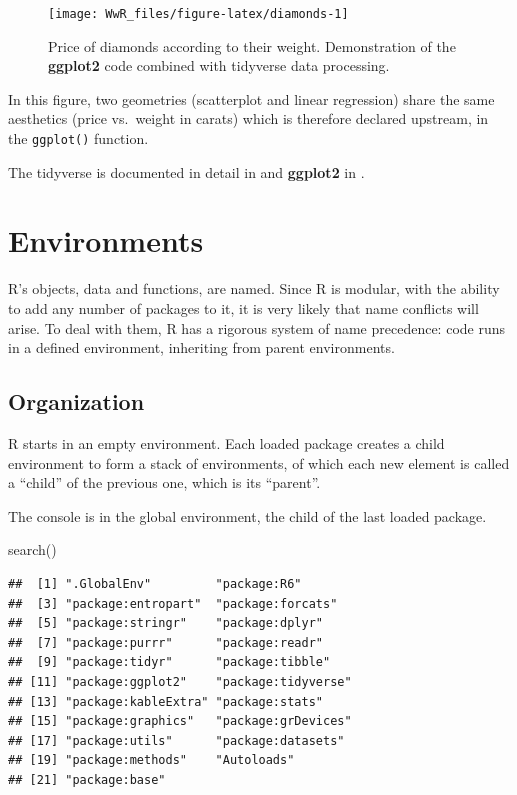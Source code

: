 \documentclass[
  12pt,
  american,
  a4paper,
  extrafontsizes,onecolumn,openright
  ]{memoir}
\newenvironment{Shaded}{\begin{snugshade}}{\end{snugshade}}
\newcommand{\FunctionTok}[1]{\textcolor[rgb]{0.00,0.00,0.00}{#1}}
\newcommand{\NormalTok}[1]{#1}
\begin{document}
\begin{figure}

{\centering \texttt{[image: WwR\_files/figure-latex/diamonds-1]} 

}

\caption{Price of diamonds according to their weight. Demonstration of the \textbf{ggplot2} code combined with tidyverse data processing.}\label{fig:diamonds}
\end{figure}

\normalsize

In this figure, two geometries (scatterplot and linear regression) share the same aesthetics (price vs.~weight in carats) which is therefore declared upstream, in the \texttt{ggplot()} function.

The tidyverse is documented in detail in \textcite{Wickham2016} and \textbf{ggplot2} in \textcite{Wickham2017}.

\hypertarget{sec:environnements}{%
\section{Environments}\label{sec:environnements}}

R's objects, data and functions, are named.
Since R is modular, with the ability to add any number of packages to it, it is very likely that name conflicts will arise.
To deal with them, R has a rigorous system of name precedence: code runs in a defined environment, inheriting from parent environments.

\hypertarget{organization}{%
\subsection{Organization}\label{organization}}

R starts in an empty environment.
Each loaded package creates a child environment to form a stack of environments, of which each new element is called a \enquote{child} of the previous one, which is its \enquote{parent}.

The console is in the global environment, the child of the last loaded package.

\scriptsize

\begin{Shaded}
\begin{Highlighting}[]
\FunctionTok{search}\NormalTok{()}
\end{Highlighting}
\end{Shaded}

\begin{verbatim}
##  [1] ".GlobalEnv"         "package:R6"        
##  [3] "package:entropart"  "package:forcats"   
##  [5] "package:stringr"    "package:dplyr"     
##  [7] "package:purrr"      "package:readr"     
##  [9] "package:tidyr"      "package:tibble"    
## [11] "package:ggplot2"    "package:tidyverse" 
## [13] "package:kableExtra" "package:stats"     
## [15] "package:graphics"   "package:grDevices" 
## [17] "package:utils"      "package:datasets"  
## [19] "package:methods"    "Autoloads"         
## [21] "package:base"
\end{verbatim}
\end{document}
